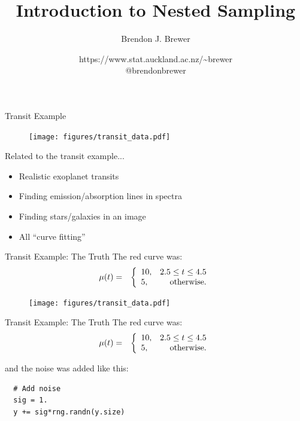 \documentclass{beamer}
\author{Brendon J. Brewer}
\title{Introduction to Nested Sampling}
\institute{Department of Statistics, The University of Auckland}
\date{{\color{blue} https://www.stat.auckland.ac.nz/\~{ }brewer}\\
\vspace{10pt}
{\color{blue} @brendonbrewer}}
\begin{document}
\begin{frame}[t,plain]
\titlepage
\end{frame}

\begin{frame}[t]{Transit Example}
\begin{figure}
\texttt{[image: figures/transit\_data.pdf]}
\end{figure}
\end{frame}



\begin{frame}[t]{Related to the transit example...}
\begin{itemize}
\item Realistic exoplanet transits
\item Finding emission/absorption lines in spectra
\item Finding stars/galaxies in an image
\item All ``curve fitting''
\end{itemize}
\end{frame}


\begin{frame}[t]{Transit Example: The Truth}
The red curve was:
\begin{eqnarray*}
\mu(t) &=& \left\{
\begin{array}{lr}
10, & 2.5 \leq t \leq 4.5\\
5,  & \textnormal{otherwise}.
\end{array}
\right.
\end{eqnarray*}

\begin{figure}
\texttt{[image: figures/transit\_data.pdf]}
\end{figure}
\end{frame}

\begin{frame}[fragile, t]{Transit Example: The Truth}
The red curve was:
\begin{eqnarray*}
\mu(t) &=& \left\{
\begin{array}{lr}
10, & 2.5 \leq t \leq 4.5\\
5,  & \textnormal{otherwise}.
\end{array}
\right.
\end{eqnarray*}

and the noise was added like this:
\begin{verbatim}
  # Add noise
  sig = 1.
  y += sig*rng.randn(y.size)
\end{verbatim}
\end{frame}
\end{document}
